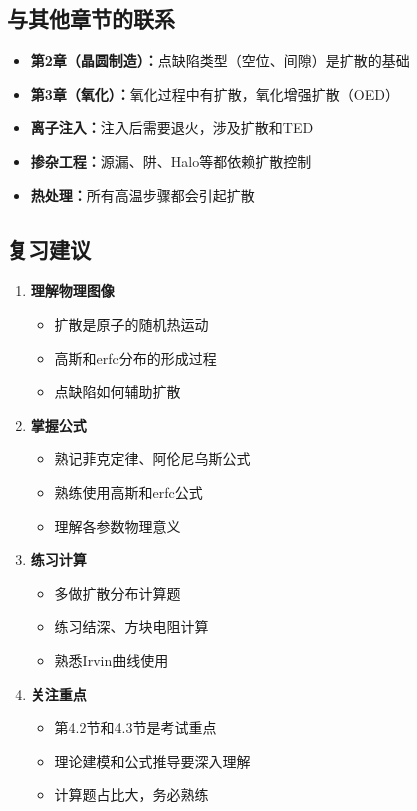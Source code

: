 \documentclass[UTF8,12pt,a4paper]{ctexart}
\begin{document}
\subsection{与其他章节的联系}

\begin{itemize}
    \item \textbf{第2章（晶圆制造）：}点缺陷类型（空位、间隙）是扩散的基础
    \item \textbf{第3章（氧化）：}氧化过程中有扩散，氧化增强扩散（OED）
    \item \textbf{离子注入：}注入后需要退火，涉及扩散和TED
    \item \textbf{掺杂工程：}源漏、阱、Halo等都依赖扩散控制
    \item \textbf{热处理：}所有高温步骤都会引起扩散
\end{itemize}

\subsection{复习建议}

\begin{enumerate}
    \item \textbf{理解物理图像}
    \begin{itemize}
        \item 扩散是原子的随机热运动
        \item 高斯和erfc分布的形成过程
        \item 点缺陷如何辅助扩散
    \end{itemize}
    
    \item \textbf{掌握公式}
    \begin{itemize}
        \item 熟记菲克定律、阿伦尼乌斯公式
        \item 熟练使用高斯和erfc公式
        \item 理解各参数物理意义
    \end{itemize}
    
    \item \textbf{练习计算}
    \begin{itemize}
        \item 多做扩散分布计算题
        \item 练习结深、方块电阻计算
        \item 熟悉Irvin曲线使用
    \end{itemize}
    
    \item \textbf{关注重点}
    \begin{itemize}
        \item 第4.2节和4.3节是考试重点
        \item 理论建模和公式推导要深入理解
        \item 计算题占比大，务必熟练
    \end{itemize}
\end{enumerate}
\end{document}
